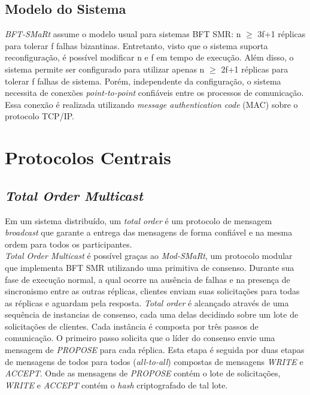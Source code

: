 		\subsection{Modelo do Sistema}
		\textit{BFT-SMaRt} assume o modelo usual para sistemas BFT SMR: n $\geq$ 3f+1 réplicas para tolerar f falhas bizantinas. Entretanto, visto que o sistema suporta reconfiguração, é possível modificar n e f em tempo de execução. Além disso, o sistema permite ser configurado para utilizar apenas n $\geq$ 2f+1 réplicas para tolerar f falhas de sistema. Porém, independente da configuração, o sistema necessita de conexões \textit{point-to-point} confiáveis entre os processos de comunicação. Essa conexão é realizada utilizando \textit{message authentication code} (MAC) sobre o protocolo TCP/IP.\\
	
	\section{Protocolos Centrais}
	
		\subsection{\textit{Total Order Multicast}}
		Em um sistema distribuído, um \textit{total order} é um protocolo de mensagem \textit{broadcast} que garante a entrega das mensagens de forma confiável e na mesma ordem para todos os participantes.\\
		
		\textit{Total Order Multicast} é possível graças ao \textit{Mod-SMaRt}, um protocolo modular que implementa BFT SMR utilizando uma primitiva de consenso. Durante sua fase de execução normal, a qual ocorre na ausência de falhas e na presença de sincronismo entre as outras réplicas, clientes enviam suas solicitações para todas as réplicas e aguardam pela resposta. \textit{Total order} é alcançado através de uma sequência de instancias de consenso, cada uma delas decidindo sobre um lote de solicitações de clientes. Cada instância é composta por três passos de comunicação. O primeiro passo solicita que o líder do consenso envie uma mensagem de \textit{PROPOSE} para cada réplica. Esta etapa é seguida por duas etapas de mensagens de todos para todos (\textit{all-to-all}) compostas de mensagens \textit{WRITE} e \textit{ACCEPT}. Onde as mensagens de \textit{PROPOSE} contém o lote de solicitações, \textit{WRITE} e \textit{ACCEPT} contém o \textit{hash} criptografado de tal lote.\\
		
